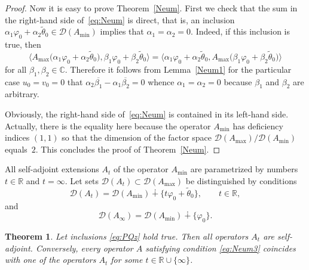 \documentclass[10pt,a4paper]{amsart}
\numberwithin{equation}{section}
\newtheorem{Theorem}{Theorem}[section]
\begin{document}
\begin{proof}
 Now it is easy to prove Theorem~\ref{Neum}. First we check that the sum in the right-hand side of~\eqref{eq:Neum} is direct, that is, an inclusion
 $
\alpha_{1} \varphi_{0}+ \alpha_{2} \tilde{\theta}_{0 }\in {\mathcal D}(A_{\min})
$
 implies that $\alpha_{1}= \alpha_{2} =0$. Indeed, if this inclusion is true, then
 \[
 \big\langle A_{\max} \big(\alpha_{1} \varphi_{0}+ \alpha_{2} \tilde{\theta}_{0 }\big), \beta_{1} \varphi_{0}+ \beta_{2} \tilde{\theta}_{0 }\big\rangle = \big\langle \alpha_{1} \varphi_{0}+ \alpha_{2} \tilde{\theta}_{0 }, A_{\max} \big(\beta_{1} \varphi_{0}+ \beta_{2} \tilde{\theta}_{0 }\big)\big\rangle
 \]
 for all $\beta_{1}, \beta_{2}\in {\mathbb C}$. Therefore it follows from Lemma~\ref{Neum1} for the particular case $u_{0}=v_{0}=0$ that $ \alpha_{2} \overline{\beta_{1}}-\alpha_{1} \overline{\beta_{2}}=0$ whence $ \alpha_{1} = \alpha_{2}=0$ because $ \beta_{1} $ and $ \beta_{2}$ are arbitrary.

 Obviously, the right-hand side of~\eqref{eq:Neum} is contained in its left-hand side. Actually, there is the equality here because the operator $A_{\min}$ has deficiency indices $(1,1)$ so that the dimension of the factor space $ {\mathcal D}(A_{\max}) / {\mathcal D}(A_{\min}) $ equals~$2$. This concludes the proof of Theorem~\ref{Neum}.
 \end{proof}

All self-adjoint extensions $A_{t}$ of the operator $A_{\min}$ are parametrized by numbers $ t\in {\mathbb R}$ and $t=\infty$. Let sets ${\mathcal D}(A_{t})\subset {\mathcal D}(A_{\max})$ be distinguished by conditions
 \begin{equation}
{\mathcal D}(A_{t})= {\mathcal D}(A_{\min})\dotplus \big\{ t \varphi_{0} + \tilde{\theta}_{0}\big\}, \qquad t\in {\mathbb R},
 \label{eq:Neum1}\end{equation}
and
 \begin{equation}
{\mathcal D}(A_\infty)= {\mathcal D}(A_{\min})\dotplus \{ \varphi_{0 } \}.
 \label{eq:Neum2}\end{equation}

\begin{Theorem}\label{Neum2}
 Let inclusions \eqref{eq:PQz} hold true. Then all operators $A_{t}$ are self-adjoint. Conversely, every operator $A$ satisfying condition
 \eqref{eq:Neum3}
coincides with one of the operators $A_{t}$ for some $t\in{\mathbb R}\cup \{\infty\}$.
 \end{Theorem}
\end{document}
